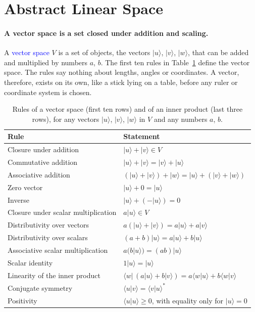 \section{Abstract Linear Space}

\paragraph{A vector space is a set closed under addition and scaling.} A \textcolor{blue}{vector space} $V$ is a set of objects, the vectors $|u\rangle$, $|v\rangle$, $|w\rangle$, that can be added and multiplied by numbers $a$, $b$. The first ten rules in Table~\ref{tab:axioms} define the vector space. The rules say nothing about lengths, angles or coordinates. A vector, therefore, exists on its own, like a stick lying on a table, before any ruler or coordinate system is chosen.

\begin{table}[h]
    \centering
    \caption{Rules of a vector space (first ten rows) and of an inner product (last three rows), for any vectors $|u\rangle$, $|v\rangle$, $|w\rangle$ in $V$ and any numbers $a$, $b$.}
    \label{tab:axioms}
    \renewcommand{\arraystretch}{1.3}
    \begin{tabular}{ll}
        \toprule
        Rule & Statement \\
        \midrule
        Closure under addition & $|u\rangle + |v\rangle \in V$ \\
        Commutative addition & $|u\rangle + |v\rangle = |v\rangle + |u\rangle$ \\
        Associative addition & $(|u\rangle + |v\rangle) + |w\rangle = |u\rangle + (|v\rangle + |w\rangle)$ \\
        Zero vector & $|u\rangle + 0 = |u\rangle$ \\
        Inverse & $|u\rangle + (-|u\rangle) = 0$ \\
        Closure under scalar multiplication & $a|u\rangle \in V$ \\
        Distributivity over vectors & $a(|u\rangle + |v\rangle) = a|u\rangle + a|v\rangle$ \\
        Distributivity over scalars & $(a+b)|u\rangle = a|u\rangle + b|u\rangle$ \\
        Associative scalar multiplication & $a(b|u\rangle) = (ab)|u\rangle$ \\
        Scalar identity & $1|u\rangle = |u\rangle$ \\
        \midrule
        Linearity of the inner product & $\langle w|\,(a|u\rangle + b|v\rangle) = a\langle w|u\rangle + b\langle w|v\rangle$ \\
        Conjugate symmetry & $\langle u|v\rangle = \langle v|u\rangle^*$ \\
        Positivity & $\langle u|u\rangle \geq 0$, with equality only for $|u\rangle = 0$ \\
        \bottomrule
    \end{tabular}
\end{table}

